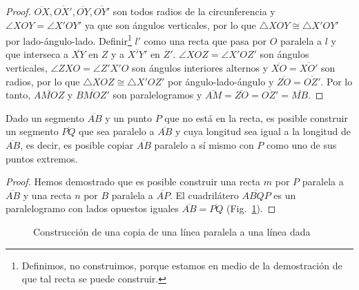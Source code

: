 \begin{proof}
$\overline{OX}, \overline{OX'}, \overline{OY}, \overline{OY'}$ son todos radios de la circunferencia y $\angle XOY = \angle X'OY'$ ya que son ángulos verticales, por lo que $\triangle XOY\cong\triangle X'OY'$ por lado-ángulo-lado. Definir\footnote{Definimos, no construimos, porque estamos en medio de la demostración de que tal recta se puede construir.} $l'$ como una recta que pasa por $O$ paralela a $l$ y que interseca a $\overline{XY}$ en $Z$ y a $\overline{X'Y'}$ en $Z'$. $\angle XOZ=\angle X'OZ'$ son ángulos verticales, $\angle ZXO=\angle Z'X'O$ son ángulos interiores alternos y $\overline{XO}=\overline{XO'}$ son radios, por lo que $\triangle XOZ\cong\triangle X'OZ'$ por ángulo-lado-ángulo y $\overline{ZO}=\overline{OZ'}$. Por lo tanto, $\overline{AMOZ}$ y $\overline{BMOZ'}$ son paralelogramos y $\overline{AM}=\overline{ZO}=\overline{OZ'}=\overline{MB}$.
\end{proof}

\begin{theorem}\label{thm.parallel-equal}
Dado un segmento $\overline{AB}$ y un punto $P$ que no está en la recta, es posible construir un segmento $\overline{PQ}$ que sea paralelo a $\overline{AB}$ y cuya longitud sea igual a la longitud de $\overline{AB}$, es decir, es posible copiar $\overline{AB}$ paralelo a sí mismo con $P$ como uno de sus puntos extremos.
\end{theorem}

\begin{proof}
Hemos demostrado que es posible construir una recta $m$ por $P$ paralela a $\overline{AB}$ y una recta $n$ por $B$ paralela a $\overline{AP}$. El cuadrilátero $\overline{ABQP}$ es un paralelogramo con lados opuestos iguales $\overline{AB}=\overline{PQ}$ (Fig.~\ref{f.se-parallel-other4}).
\end{proof}

\begin{figure}[t]
\begin{center}
\end{center}
\caption{Construcción de una copia de una línea paralela a una línea dada}\label{f.se-parallel-other4}
\end{figure}

